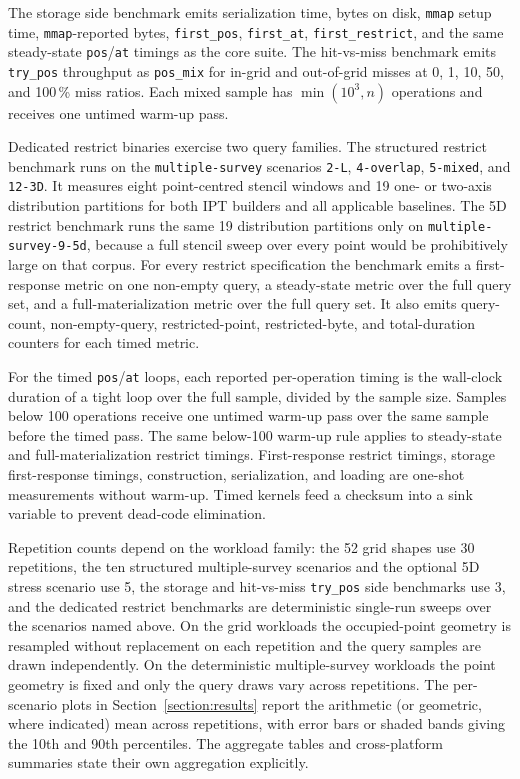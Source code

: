 \documentclass[manuscript,screen,review]{acmart}
\theoremstyle{definition}
\theoremstyle{plain}
\begin{document}
The storage side benchmark emits serialization time, bytes on disk,
\texttt{mmap} setup time, \texttt{mmap}-reported bytes,
\texttt{first\_pos}, \texttt{first\_at}, \texttt{first\_restrict}, and
the same steady-state \texttt{pos}/\texttt{at} timings as the core
suite. The hit-vs-miss benchmark emits \texttt{try\_pos} throughput as
\texttt{pos\_mix} for in-grid and out-of-grid misses at 0, 1, 10, 50,
and 100\,\% miss ratios. Each mixed sample has $\min(10^3,n)$
operations and receives one untimed warm-up pass.

Dedicated restrict binaries exercise two query families. The structured
restrict benchmark runs on the \texttt{multiple-survey} scenarios
\texttt{2-L}, \texttt{4-overlap}, \texttt{5-mixed}, and \texttt{12-3D}. It measures eight point-centred
stencil windows and 19 one- or two-axis distribution partitions for
both IPT builders and all applicable baselines. The 5D restrict
benchmark runs the same 19 distribution partitions only on
\texttt{multiple-survey-9-5d}, because a full stencil sweep over every
point would be prohibitively large on that corpus. For every restrict
specification the benchmark emits a first-response metric on one
non-empty query, a steady-state metric over the full query set, and a
full-materialization metric over the full query set. It also emits
query-count, non-empty-query, restricted-point, restricted-byte, and
total-duration counters for each timed metric.

For the timed \texttt{pos}/\texttt{at} loops, each reported per-operation
timing is the wall-clock duration of a tight loop over the full sample,
divided by the sample size.
Samples below 100 operations receive one untimed warm-up pass over the
same sample before the timed pass.
The same below-100 warm-up rule applies to steady-state and
full-materialization restrict timings.
First-response restrict timings, storage first-response timings,
construction, serialization, and loading are one-shot measurements
without warm-up.
Timed kernels feed a checksum into a sink variable to prevent dead-code
elimination.

Repetition counts depend on the workload family: the 52 grid shapes use
30 repetitions, the ten structured multiple-survey scenarios and the
optional 5D stress scenario use 5, the storage and hit-vs-miss
\texttt{try\_pos} side benchmarks use 3, and the dedicated restrict
benchmarks are deterministic single-run sweeps over the scenarios named
above.
On the grid workloads the occupied-point geometry is resampled without
replacement on each repetition and the query samples are drawn
independently. On the deterministic multiple-survey workloads the point
geometry is fixed and only the query draws vary across repetitions.
The per-scenario plots in Section~\ref{section:results} report the
arithmetic (or geometric, where indicated) mean across repetitions, with
error bars or shaded bands giving the 10th and 90th percentiles.
The aggregate tables and cross-platform summaries state their own
aggregation explicitly.
\end{document}
